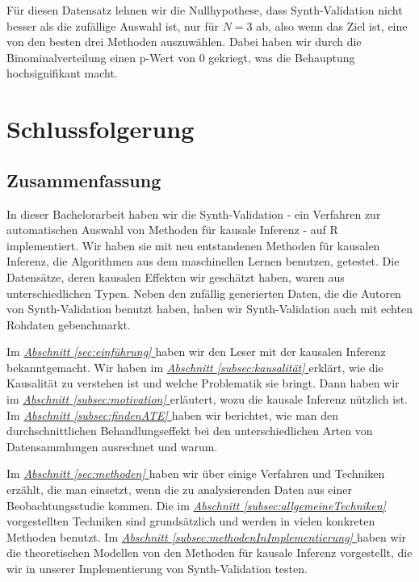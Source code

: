 \documentclass[12pt,a4paper,twoside]{scrartcl}
\numberwithin{equation}{section}
\newcommand{\refsec}[1]{\emph{\hyperref[#1]{Abschnitt \ref*{#1} }}}
\begin{document}
\noindent
Für diesen Datensatz lehnen wir die Nullhypothese, dass Synth-Validation nicht besser als die zufällige Auswahl ist, nur für $N=3$ ab, also wenn das Ziel ist, eine von den besten drei Methoden auszuwählen. Dabei haben wir durch die Binominalverteilung einen p-Wert von 0 gekriegt, was die Behauptung hochsignifikant macht.\par

\clearpage

\section{Schlussfolgerung}\label{sec:schlussfolgerung}

\subsection{Zusammenfassung}\label{subsec:zusammenfassung}

In dieser Bachelorarbeit haben wir die Synth-Validation - ein Verfahren zur automatischen Auswahl von Methoden für kausale Inferenz - auf R implementiert. Wir haben sie mit neu entstandenen Methoden für kausalen Inferenz, die Algorithmen aus dem maschinellen Lernen benutzen, getestet. Die Datensätze, deren kausalen Effekten wir geschätzt haben, waren aus unterschiedlichen Typen. Neben den zufällig generierten Daten, die die Autoren von Synth-Validation benutzt haben, haben wir Synth-Validation auch mit echten Rohdaten gebenchmarkt.\par

\noindent
Im \refsec{sec:einführung} haben wir den Leser mit der kausalen Inferenz bekanntgemacht. Wir haben im \refsec{subsec:kausalität} erklärt, wie die Kausalität zu verstehen ist und welche Problematik sie bringt. Dann haben wir im \refsec{subsec:motivation} erläutert, wozu die kausale Inferenz nützlich ist. Im \refsec{subsec:findenATE} haben wir berichtet, wie man den durchschnittlichen Behandlungseffekt bei den unterschiedlichen Arten von Datensammlungen ausrechnet und warum.\par 

\noindent
Im \refsec{sec:methoden} haben wir über einige Verfahren und Techniken erzählt, die man einsetzt, wenn die zu analysierenden Daten aus einer Beobachtungsstudie kommen. Die im \refsec{subsec:allgemeineTechniken} vorgestellten Techniken sind grundsätzlich und werden in vielen konkreten Methoden benutzt. Im \refsec{subsec:methodenInImplementierung} haben wir die theoretischen Modellen von den Methoden für kausale Inferenz vorgestellt, die wir in unserer Implementierung von Synth-Validation testen.\par
\end{document}
